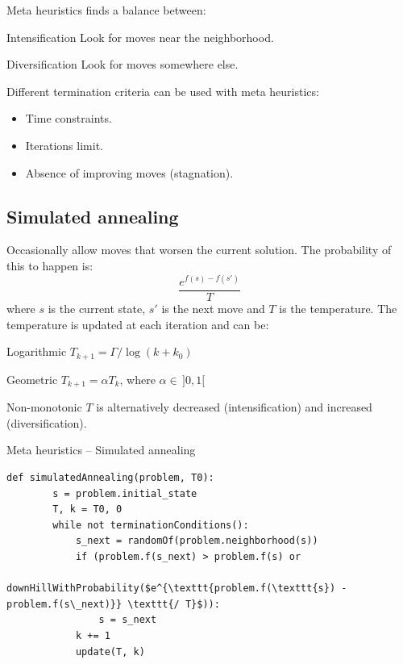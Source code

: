 Meta heuristics finds a balance between:
\begin{descriptionlist}
    \item[Intensification] 
        Look for moves near the neighborhood.
    \item[Diversification] 
        Look for moves somewhere else.
\end{descriptionlist}

Different termination criteria can be used with meta heuristics:
\begin{itemize}
    \item Time constraints.
    \item Iterations limit.
    \item Absence of improving moves (stagnation).
\end{itemize}


\subsection{Simulated annealing}
Occasionally allow moves that worsen the current solution.
The probability of this to happen is:
\[
    \frac{e^{f(s) - f(s')}}{T}
\]
where $s$ is the current state, $s'$ is the next move and $T$ is the temperature.
The temperature is updated at each iteration and can be:
\begin{descriptionlist}
    \item[Logarithmic] $T_{k+1} = \Gamma / \log(k + k_0) $
    \item[Geometric] $T_{k+1} = \alpha T_k$, where $\alpha \in\, ]0, 1[$
    \item[Non-monotonic] $T$ is alternatively decreased (intensification) and increased (diversification).
\end{descriptionlist}

\begin{algorithm}
\caption{Meta heuristics -- Simulated annealing}
\begin{lstlisting}[mathescape=true]
    def simulatedAnnealing(problem, T0):
        s = problem.initial_state
        T, k = T0, 0
        while not terminationConditions():
            s_next = randomOf(problem.neighborhood(s))
            if (problem.f(s_next) > problem.f(s) or
               downHillWithProbability($e^{\texttt{problem.f(\texttt{s}) - problem.f(s\_next)}} \texttt{/ T}$)):
                s = s_next
            k += 1
            update(T, k)
\end{lstlisting}
\end{algorithm}


